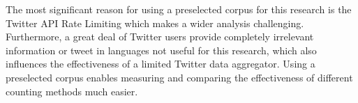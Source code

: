 The most significant reason for using a preselected corpus for this research is
the Twitter API Rate Limiting which makes a wider analysis challenging.
Furthermore, a great deal of Twitter users provide completely irrelevant
information or tweet in languages not useful for this research, which also
influences the effectiveness of a limited Twitter data aggregator. Using a preselected corpus enables measuring and comparing the effectiveness of different counting methods much easier.
